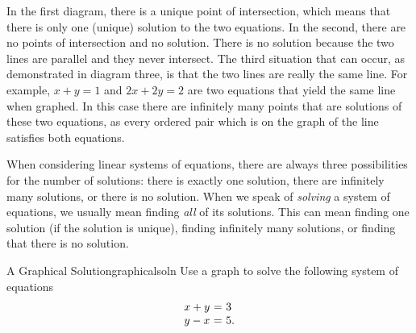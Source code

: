 In the first diagram, there is a unique point of
intersection, which means that there is only one (unique) solution to the two equations. 
In the second, there are no points of intersection and  no solution. There is no solution because the two lines are parallel and they never intersect.
The third situation that can occur, as demonstrated in diagram three, is that the two lines are really the same line. For
example, $x+y=1$ and $2x+2y=2$ are two equations that yield the
same line when graphed. In this case there are infinitely many points that are
solutions of these two equations, as every ordered pair which is on the graph of
the line satisfies both equations. 

When considering linear systems of equations, there are always three
possibilities for the number of solutions: there is exactly one
solution, there are infinitely many solutions, or there is no
solution.  When we speak of {\em solving} a system of equations, we
usually mean finding {\em all} of its solutions. This can mean finding
one solution (if the solution is unique), finding infinitely many
solutions, or finding that there is no solution.

\begin{example}{A Graphical Solution}{graphicalsoln}
Use a graph to solve the following system of equations \:
\begin{equation*}
\begin{array}{r@{~}c@{~}l}
x+y&=&3 \\
y-x&=&5.
\end{array}
\end{equation*}
\end{example} 

